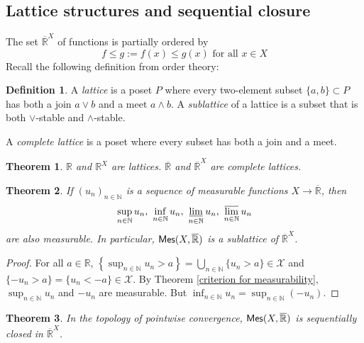 \documentclass[11pt, a4paper, openany]{book}
\newtheorem{thm}{Theorem}\newtheorem{lem}{Lemma}\newtheorem{crl}{Corollary}
\theoremstyle{definition}
\newtheorem{define}{Definition}\newtheorem{exam}{Example}\newtheorem{remark}{Remark}
\newcommand{\cat}[1]{\textup{\textsf{#1}}}
\newcommand{\er}{\overline{\mathbb{R}}}
\begin{document}
\subsection{Lattice structures and sequential closure}
    The set $\er^X$ of functions is partially ordered by
    \[
        f\leqslant g:= f(x)\leqslant g(x)\text{ for all }x\in X
    \]
    Recall the following definition from order theory:
    \begin{define}
        A \textit{lattice} is a poset $P$ where every two-element subset $\{a,b\}\subset P$ has both a join $a\vee b$ and a meet $a\wedge b$.
        A \textit{sublattice} of a lattice is a subset that is both $\vee$-stable and $\wedge$-stable.

        A \textit{complete lattice} is a poset where every subset has both a join and a meet.
    \end{define}
    \begin{thm}
        $\mathbb{R}$ and $\mathbb{R}^X$ are lattices. $\er$ and $\er^X$ are complete lattices.
    \end{thm}
    \begin{thm}\label{lattice}
        If $(u_n)_{n\in\mathbb{N}}$ is a sequence of measurable functions $X\rightarrow \er$, then
        \[
            \sup_{n\in\mathbb{N}}u_n,\,\,\inf_{n\in\mathbb{N}}u_n,\,\,\varliminf_{n\in\mathbb{N}}  u_n,\,\,\varlimsup_{n\in\mathbb{N}}u_n
        \]
        are also measurable. In particular, $\cat{Mes}(X,\er)$ is a sublattice of $\er^X$.
    \end{thm}
    \begin{proof}
        For all $a\in\mathbb{R}$, $\left\{\sup_{n\in\mathbb{N}}u_n>a\right\}=\bigcup_{n\in\mathbb{N}}\{u_n>a\}\in\mathscr{X}$ and $\{-u_n>a\}=\{u_n<-a\}\in\mathscr{X}$. By Theorem \ref{criterion for measurability}, $\sup_{n\in\mathbb{N}}u_n$ and $-u_n$ are measurable. But $\inf_{n\in\mathbb{N}}u_n=\sup_{n\in\mathbb{N}}(-u_n)$.
    \end{proof}
    \begin{thm}\label{sequential closure of measurable functions}
        In the topology of pointwise convergence, $\cat{Mes}(X,\er)$ is sequentially closed in $\er^{X}$.
    \end{thm}
\end{document}
